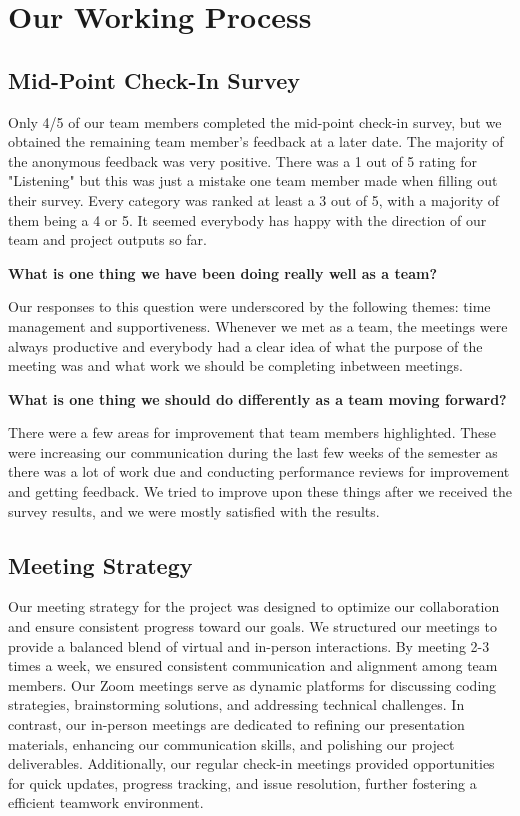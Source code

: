 \documentclass[
]{book}
\begin{document}
\hypertarget{our-working-process}{%
\chapter{Our Working Process}\label{our-working-process}}

\hypertarget{mid-point-check-in-survey}{%
\section{Mid-Point Check-In Survey}\label{mid-point-check-in-survey}}

Only 4/5 of our team members completed the mid-point check-in survey, but we obtained the remaining team member's feedback at a later date. The majority of the anonymous feedback was very positive. There was a 1 out of 5 rating for "Listening" but this was just a mistake one team member made when filling out their survey. Every category was ranked at least a 3 out of 5, with a majority of them being a 4 or 5. It seemed everybody has happy with the direction of our team and project outputs so far.~

\textbf{What is one thing we have been doing really well as a team?}

Our responses to this question were underscored by the following themes: time management and supportiveness. Whenever we met as a team, the meetings were always productive and everybody had a clear idea of what the purpose of the meeting was and what work we should be completing inbetween meetings.

\textbf{What is one thing we should do differently as a team moving forward?}

There were a few areas for improvement that team members highlighted. These were increasing our communication during the last few weeks of the semester as there was a lot of work due and conducting performance reviews for improvement and getting feedback. We tried to improve upon these things after we received the survey results, and we were mostly satisfied with the results.

\hypertarget{meeting-strategy}{%
\section{Meeting Strategy}\label{meeting-strategy}}

Our meeting strategy for the project was designed to optimize our collaboration and ensure consistent progress toward our goals. We structured our meetings to provide a balanced blend of virtual and in-person interactions. By meeting 2-3 times a week, we ensured consistent communication and alignment among team members. Our Zoom meetings serve as dynamic platforms for discussing coding strategies, brainstorming solutions, and addressing technical challenges. In contrast, our in-person meetings are dedicated to refining our presentation materials, enhancing our communication skills, and polishing our project deliverables. Additionally, our regular check-in meetings provided opportunities for quick updates, progress tracking, and issue resolution, further fostering a efficient teamwork environment.
\end{document}
